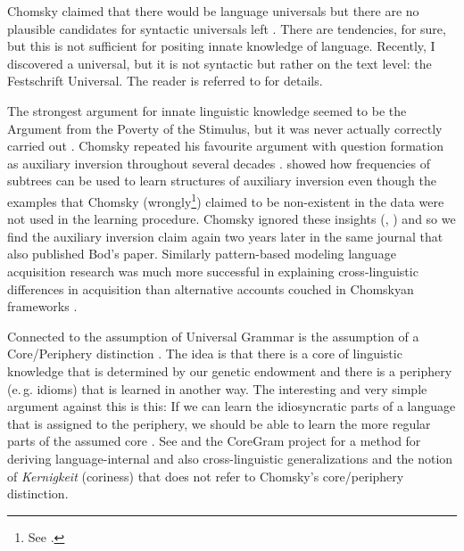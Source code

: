 Chomsky claimed that there would be language universals but there are no plausible candidates for
syntactic universals left \parencites{EL2009a}[Section~13.1]{MuellerGT-Eng5}. There are tendencies, for sure, but this is not sufficient for positing
innate knowledge of language. Recently, I discovered a universal, but it is not syntactic but rather
on the text level: the Festschrift Universal. The reader is referred to 
for details.

The strongest argument for innate linguistic knowledge seemed to be the Argument from the Poverty of the Stimulus, but
it was never actually correctly carried out \citep{PS2002a,SP2002b}. Chomsky repeated his favourite argument
with question formation as auxiliary inversion throughout several decades \parencites[--33]{Chomsky71a-u}[]{Chomsky2013a}. \citet{Bod2009a} showed
how frequencies of subtrees can be used to learn structures of auxiliary inversion even though the
examples that Chomsky (wrongly\footnote{%
See \citet[--45]{PS2002a}.
}) claimed to be non-existent in the data were not used in the learning
procedure. Chomsky ignored these insights (\citealt*{BPYC2011a}, \citealt[]{Chomsky2013a}) and so we
find the auxiliary inversion claim again two years later in the same journal that also published Bod's paper.
Similarly pattern-based modeling language acquisition research was much more successful in explaining
cross-linguistic differences in acquisition than alternative accounts couched in Chomskyan
frameworks \citep{FPG2006a,FPAG2007a,FPG2009a}. 

Connected to the assumption of Universal Grammar is the assumption of a Core/Periphery
distinction \parencites[--8]{Chomsky81a}[--151]{Chomsky86a}[]{Fodor98a}. The idea is that there is a core of linguistic knowledge that is determined by our
genetic endowment and there is a periphery (e.\,g. idioms) that is learned in another way. The interesting and very
simple argument against this is this: If we can learn the idiosyncratic parts of a language that is
assigned to the periphery, we should be able to learn the more regular parts of the assumed core
\parencites[]{Abney96a}[]{Goldberg2003b}[]{Newmeyer2005a}[]{Tomasello2006a}[]{Tomasello2006c}{MuellerKernigkeit}. See  and the CoreGram project \citep{MuellerCoreGram}
for a method for deriving language-internal and also cross-linguistic generalizations and the notion
of \emph{Kernigkeit} (coriness) that does not refer to Chomsky's core/periphery distinction. 

